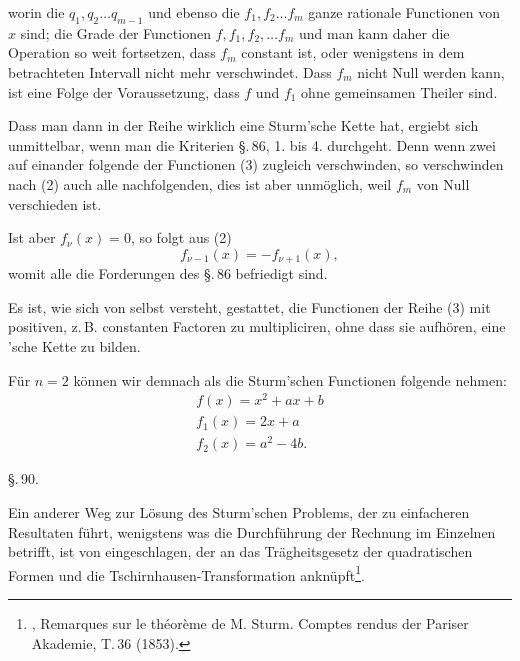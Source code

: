 worin die $q_1, q_2 \ldots q_{m-1}$ und ebenso die $f_1, f_2 \ldots f_m$ ganze rationale Functionen von $x$ sind; die Grade der Functionen $f, f_1, f_2, \ldots f_m$  und man kann daher die Operation so weit fortsetzen, dass $f_m$ constant ist, oder wenigstens in dem betrachteten Intervall nicht mehr verschwindet. Dass $f_m$ nicht Null werden kann, ist eine Folge der Voraussetzung, dass $f$ und $f_1$ ohne gemeinsamen Theiler sind.

Dass man dann in der Reihe
wirklich eine Sturm'sche Kette hat, ergiebt sich unmittelbar, wenn man die Kriterien \S.\,86, 1. bis 4. durchgeht. Denn wenn zwei auf einander folgende der Functionen (3) zugleich verschwinden, so verschwinden nach (2) auch alle nachfolgenden, dies ist aber unm\"oglich, weil $f_m$ von Null verschieden ist.

Ist aber $f_\nu(x) = 0$, so folgt aus (2)
\[ f_{\nu-1}(x) = -f_{\nu+1}(x), \]
womit alle die Forderungen des \S.\,86 befriedigt sind.

Es ist, wie sich von selbst versteht, gestattet, die Functionen der Reihe (3) mit positiven, z.\,B. constanten Factoren zu multipliciren, ohne dass sie aufh\"oren, eine 'sche Kette zu bilden.

F\"ur $n=2$ k\"onnen wir demnach als die Sturm'schen Functionen folgende nehmen:
\[
\begin{gathered}
f(x) = x^2 + a x + b\\
f_1(x) = 2x + a\\
f_2(x) = a^2 - 4b.
\end{gathered}
\]

\begin{center}
\S.\,90.

\end{center}

Ein anderer Weg zur L\"osung des Sturm'schen Problems, der zu einfacheren Resultaten f\"uhrt, wenigstens was die Durchf\"uhrung der Rechnung im Einzelnen betrifft, ist von  eingeschlagen, der an das Tr\"agheitsgesetz der quadratischen Formen und die Tschirnhausen-Transformation ankn\"upft\footnote{, Remarques sur le th\'eor\`eme de M. Sturm. Comptes rendus der Pariser Akademie, T.\,36 (1853).}.

